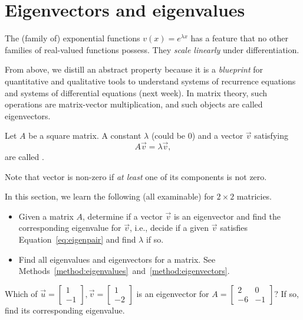 \documentclass[../main.tex]{subfiles}
\begin{document}
 \section{Eigenvectors and eigenvalues}

The (family of) exponential functions \(v(x) = e^{\lambda x}\) has a feature that no other families of real-valued  functions possess. They \emph{scale linearly} under differentiation.

From above, we distill an abstract property  because it is a \emph{blueprint} for quantitative and qualitative tools to understand systems of recurrence equations and systems of differential equations (next week). In matrix theory, such operations are matrix-vector multiplication, and such objects are called eigenvectors.  

\begin{definition}
  Let \(A\) be a square matrix. A constant \(\lambda\) (could be \(0\)) and a  vector \(\vec{v}\) satisfying 
  \begin{equation} \label{eq:eigenpair}
    A \vec{v} = \lambda \vec{v},
  \end{equation}
  are called .

  Note that vector is non-zero if \emph{at least} one of its components is not zero.
\end{definition}

In this section, we learn the following (all examinable) for \(2 \times 2\) matricies. 
\begin{itemize}
  \item Given a matrix \(A\), determine if a vector \(\vec{v}\) is an eigenvector and find the corresponding eigenvalue for \(\vec{v}\), i.e., decide if a given \(\vec{v}\) satisfies Equation~\ref{eq:eigenpair} and find \(\lambda\) if so.
  \item Find all eigenvalues and eigenvectors for a matrix. See Methods~\ref{method:eigenvalues}~and~\ref{method:eigenvectors}.
\end{itemize}

\begin{example}
  Which of \(\vec{u} = \begin{bmatrix} 1 \\ -1 \end{bmatrix}, \vec{v} = \begin{bmatrix} 1 \\ -2 \end{bmatrix}\) is an eigenvector for \(A = \begin{bmatrix} 2 & 0 \\ -6 & -1 \end{bmatrix}\)? If so, find its corresponding eigenvalue. 

\end{example}
\clearpage
\end{document}
